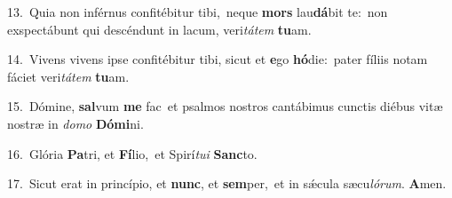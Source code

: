 {\numbfont\textcolor{\numbcolor}{13.}}~Quia non inférnus confitébitur tibi,~\dagger neque \textbf{mors} lau\-\textbf{dá}\-bit te:~\star non exspectábunt qui descéndunt in lacum, veri\-\textit{tá}\-\textit{tem} \textbf{tu}\-am.\par
{\numbfont\textcolor{\numbcolor}{14.}}~Vivens vivens ipse confitébitur tibi, sicut et \textbf{e}\-go \textbf{hó}\-die:~\star pater fíliis notam fáciet veri\-\textit{tá}\-\textit{tem} \textbf{tu}\-am.\par
{\numbfont\textcolor{\numbcolor}{15.}}~Dómine, \textbf{sal}\-vum \textbf{me} fac~\star et psalmos nostros cantábimus cunctis diébus vitæ nostræ in \textit{do}\-\textit{mo} \textbf{Dó}\-\textbf{mi}ni.\par
{\numbfont\textcolor{\numbcolor}{16.}}~Glória \textbf{Pa}\-tri, et \textbf{Fí}\-lio,~\star et Spirí\-\textit{tu}\-\textit{i} \textbf{Sanc}\-to.\par
{\numbfont\textcolor{\numbcolor}{17.}}~Sicut erat in princípio, et \textbf{nunc}\-, et \textbf{sem}\-per,~\star et in sǽcula sæcu\-\textit{ló}\-\textit{rum}. \textbf{A}\-men.\par
